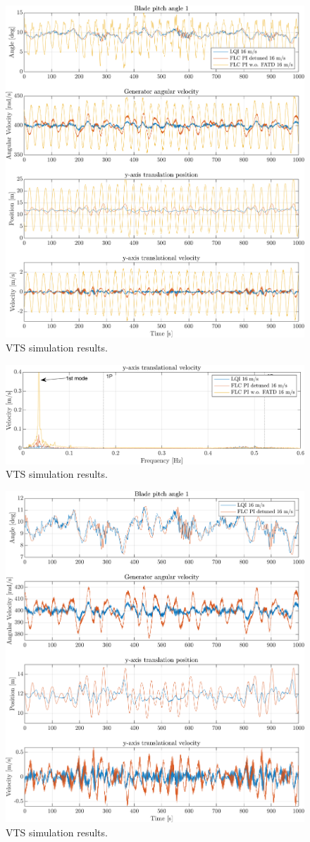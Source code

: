 \begin{figure}[ht]
	\centering
	\includegraphics[width=0.7\linewidth]{Graphics/TestResults/VTSplotting/3_th_w_py_vy.png}
	\caption{VTS simulation results.}
	\label{fig:vts_3_th_w_py_vy}
\end{figure}

\begin{figure}[ht]
	\centering
	\includegraphics[width=0.7\linewidth]{Graphics/TestResults/VTSplotting/4_fft_th_w_py_vy.png}
	\caption{VTS simulation results.}
	\label{fig:vts_4_fft_th_w_py_vy}
\end{figure}

\begin{figure}[ht]
	\centering
	\includegraphics[width=0.7\linewidth]{Graphics/TestResults/VTSplotting/10_th_w_py_vy.png}
	\caption{VTS simulation results.}
	\label{fig:vts_10_th_w_py_vy}
\end{figure}

